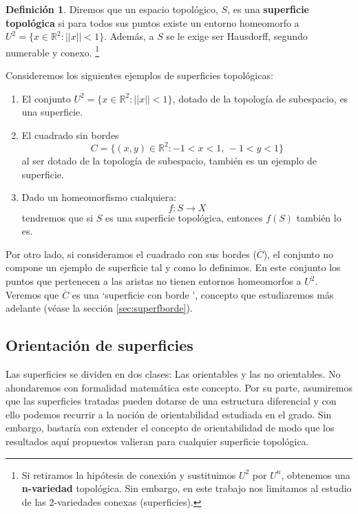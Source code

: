 \documentclass[a4paper,11pt,spanish, twoside, leqno]{tfg-uam}
\theoremstyle{definition}
\newtheorem{defin}[teor]{Definici\'on}
\begin{document}
\begin{defin}
\label{defin:superficie}
Diremos que un espacio topológico, $S$, es una \textbf{superficie topológica} si para todos sus puntos existe un entorno homeomorfo a $U^2 = \{x\in \mathbb{R}^2: ||x||<1 \}$. Además, a $S$ se le exige ser Hausdorff, segundo numerable y conexo. \footnote{Si retiramos la hipótesis de conexión y sustituimos $U^2$ por $U^n$, obtenemos una \textbf{n-variedad} topológica. Sin embargo, en este trabajo nos limitamos al estudio de las 2-variedades conexas (superficies).}
\end{defin}
Consideremos los siguientes ejemplos de superficies topológicas:
\begin{enumerate}
\item El conjunto $ U^2 = \{ x\in\mathbb{R}^2: ||x||<1 \} $, dotado de la topología de subespacio, es una superficie. 

\item El cuadrado sin bordes
\[ C = \{(x,y)\in \mathbb{R}^2: -1 <  x < 1,\, -1 < y < 1 \} \]
al ser dotado de la topología de subespacio, también es un ejemplo de superficie.

\item Dado un homeomorfismo cualquiera:
\[ f:S \rightarrow X \]
tendremos que si $S$ es una superficie topológica, entonces $f(S)$ también lo es.
\end{enumerate}

Por otro lado, si consideramos el cuadrado con sus bordes ($\overline{C}$), el conjunto no compone un ejemplo de superficie tal y como lo definimos. En este conjunto los puntos que pertenecen a las aristas no tienen entornos homeomorfos a $U^2$. Veremos que $\overline{C}$ es una \textquoteleft superficie con borde \textquoteright, concepto que estudiaremos más adelante (véase la sección \ref{sec:superfborde}).
\subsection{Orientación de superficies}
\label{sec:orientabilidad}
Las superficies se dividen en dos clases: Las orientables y las no orientables. No ahondaremos con formalidad matemática este concepto. Por su parte, asumiremos que las superficies tratadas pueden dotarse de una estructura diferencial y con ello podemos recurrir a la noción de orientabilidad estudiada en el grado. Sin embargo, bastaría con extender el concepto de orientabilidad de modo que los resultados aquí propuestos valieran para cualquier superficie topológica.
\end{document}
